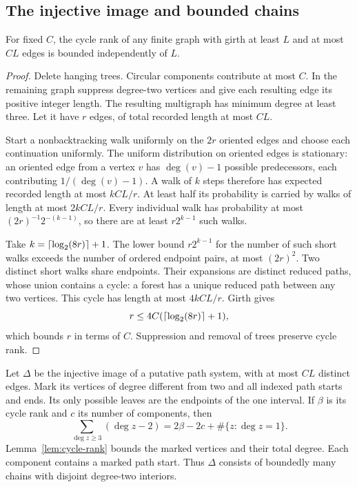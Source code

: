 \subsection{The injective image and bounded chains}
\begin{lemma}\label{lem:cycle-rank}
For fixed $C$, the cycle rank of any finite graph with girth at least $L$ and at most $CL$ edges is bounded independently of $L$.
\end{lemma}
\begin{proof}
Delete hanging trees. Circular components contribute at most $C$. In the remaining graph suppress degree-two vertices and give each resulting edge its positive integer length. The resulting multigraph has minimum degree at least three. Let it have $r$ edges, of total recorded length at most $CL$.

Start a nonbacktracking walk uniformly on the $2r$ oriented edges and choose each continuation uniformly. The uniform distribution on oriented edges is stationary: an oriented edge from a vertex $v$ has $\deg(v)-1$ possible predecessors, each contributing $1/(\deg(v)-1)$. A walk of $k$ steps therefore has expected recorded length at most $kCL/r$. At least half its probability is carried by walks of length at most $2kCL/r$. Every individual walk has probability at most $(2r)^{-1}2^{-(k-1)}$, so there are at least $r2^{k-1}$ such walks.

Take $k=\left\lceil \log_2(8r)\right\rceil+1$. The lower bound $r2^{k-1}$ for the number of such short walks exceeds the number of ordered endpoint pairs, at most $(2r)^2$. Two distinct short walks share endpoints. Their expansions are distinct reduced paths, whose union contains a cycle: a forest has a unique reduced path between any two vertices. This cycle has length at most $4kCL/r$. Girth gives
\[
 r\le4C(\left\lceil \log_2(8r)\right\rceil+1),
\]
which bounds $r$ in terms of $C$. Suppression and removal of trees preserve cycle rank.
\end{proof}

Let $\Delta$ be the injective image of a putative path system, with at most $CL$ distinct edges. Mark its vertices of degree different from two and all indexed path starts and ends. Its only possible leaves are the endpoints of the one interval. If $\beta$ is its cycle rank and $c$ its number of components, then
\[
 \sum_{\deg z\ge3}(\deg z-2)=2\beta-2c+\#\{z:\deg z=1\}.
\]
Lemma~\ref{lem:cycle-rank} bounds the marked vertices and their total degree. Each component contains a marked path start. Thus $\Delta$ consists of boundedly many chains with disjoint degree-two interiors.

